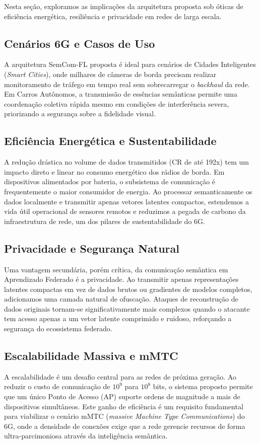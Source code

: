 \documentclass[conference,twocolumn]{IEEEtran}
\begin{document}
Nesta seção, exploramos as implicações da arquitetura proposta sob óticas de eficiência energética, resiliência e privacidade em redes de larga escala.

\subsection{Cenários 6G e Casos de Uso}
A arquitetura SemCom-FL proposta é ideal para cenários de Cidades Inteligentes (\textit{Smart Cities}), onde milhares de câmeras de borda precisam realizar monitoramento de tráfego em tempo real sem sobrecarregar o \textit{backhaul} da rede. Em Carros Autônomos, a transmissão de essências semânticas permite uma coordenação coletiva rápida mesmo em condições de interferência severa, priorizando a segurança sobre a fidelidade visual.

\subsection{Eficiência Energética e Sustentabilidade}
A redução drástica no volume de dados transmitidos (CR de até 192x) tem um impacto direto e linear no consumo energético dos rádios de borda. Em dispositivos alimentados por bateria, o subsistema de comunicação é frequentemente o maior consumidor de energia. Ao processar semanticamente os dados localmente e transmitir apenas vetores latentes compactos, estendemos a vida útil operacional de sensores remotos e reduzimos a pegada de carbono da infraestrutura de rede, um dos pilares de sustentabilidade do 6G.

\subsection{Privacidade e Segurança Natural}
Uma vantagem secundária, porém crítica, da comunicação semântica em Aprendizado Federado é a privacidade. Ao transmitir apenas representações latentes compactas em vez de dados brutos ou gradientes de modelos completos, adicionamos uma camada natural de ofuscação. Ataques de reconstrução de dados originais tornam-se significativamente mais complexos quando o atacante tem acesso apenas a um vetor latente comprimido e ruidoso, reforçando a segurança do ecossistema federado.

\subsection{Escalabilidade Massiva e mMTC}
A escalabilidade é um desafio central para as redes de próxima geração. Ao reduzir o custo de comunicação de $10^9$ para $10^8$ bits, o sistema proposto permite que um único Ponto de Acesso (AP) suporte ordens de magnitude a mais de dispositivos simultâneos. Este ganho de eficiência é um requisito fundamental para viabilizar o cenário mMTC (\textit{massive Machine Type Communications}) do 6G, onde a densidade de conexões exige que a rede gerencie recursos de forma ultra-parcimoniosa através da inteligência semântica.
\end{document}
